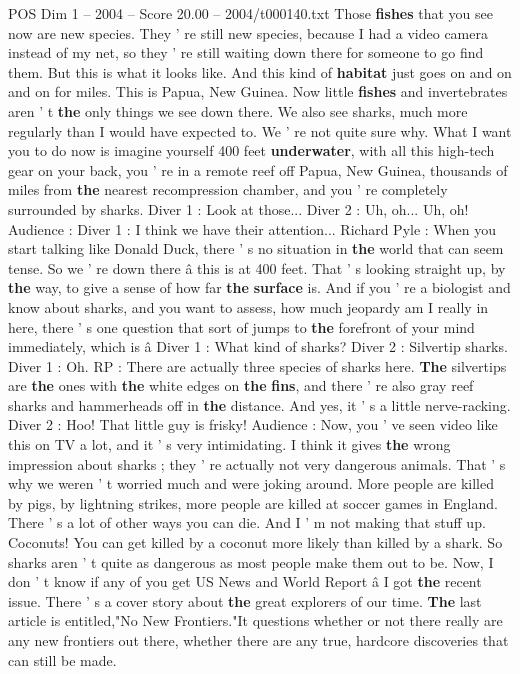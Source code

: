 \begin{textsample}{POS Dim 1 – 2004 – Score 20.00 – 2004/t000140.txt}
Those \textbf{fishes} that you see now are new species.
They ' re still new species, because I had a video camera instead of my net, so they ' re still waiting down there for someone to go find them.
But this is what it looks like.
And this kind of \textbf{habitat} just goes on and on and on for miles.
This is Papua, New Guinea.
Now little \textbf{fishes} and invertebrates aren ' t \textbf{the} only things we see down there.
We also see sharks, much more regularly than I would have expected to.
We ' re not quite sure why.
What I want you to do now is imagine yourself 400 feet \textbf{underwater}, with all this high-tech gear on your back, you ' re in a remote reef off Papua, New Guinea, thousands of miles from \textbf{the} nearest recompression chamber, and you ' re completely surrounded by sharks.
Diver 1 : Look at those...
Diver 2 : Uh, oh...
Uh, oh!
Audience : Diver 1 : I think we have their attention...
Richard Pyle : When you start talking like Donald Duck, there ' s no situation in \textbf{the} world that can seem tense.
So we ' re down there â this is at 400 feet.
That ' s looking straight up, by \textbf{the} way, to give a sense of how far \textbf{the} \textbf{surface} is.
And if you ' re a biologist and know about sharks, and you want to assess, how much jeopardy am I really in here, there ' s one question that sort of jumps to \textbf{the} forefront of your mind immediately, which is â Diver 1 : What kind of sharks?
Diver 2 : Silvertip sharks.
Diver 1 : Oh.
RP : There are actually three species of sharks here. \textbf{The} silvertips are \textbf{the} ones with \textbf{the} white edges on \textbf{the} \textbf{fins}, and there ' re also gray reef sharks and hammerheads off in \textbf{the} distance.
And yes, it ' s a little nerve-racking.
Diver 2 : Hoo!
That little guy is frisky!
Audience : Now, you ' ve seen video like this on TV a lot, and it ' s very intimidating.
I think it gives \textbf{the} wrong impression about sharks ; they ' re actually not very dangerous animals.
That ' s why we weren ' t worried much and were joking around.
More people are killed by pigs, by lightning strikes, more people are killed at soccer games in England.
There ' s a lot of other ways you can die.
And I ' m not making that stuff up.
Coconuts!
You can get killed by a coconut more likely than killed by a shark.
So sharks aren ' t quite as dangerous as most people make them out to be.
Now, I don ' t know if any of you get US News and World Report â I got \textbf{the} recent issue.
There ' s a cover story about \textbf{the} great explorers of our time. \textbf{The} last article is entitled,"No New Frontiers."It questions whether or not there really are any new frontiers out there, whether there are any true, hardcore discoveries that can still be made.

\end{textsample}
